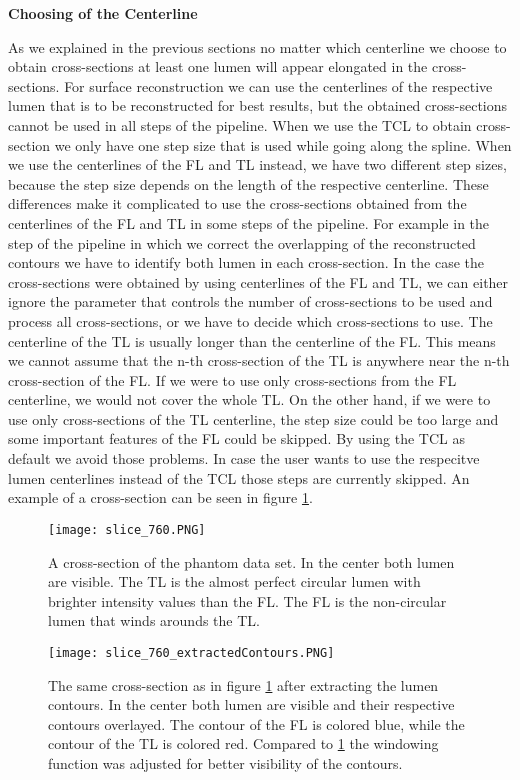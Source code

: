 \documentclass[thesis.tex]{subfiles}
\begin{document}
\textbf{Choosing of the Centerline}

As we explained in the previous sections no matter which centerline we choose to obtain cross-sections at least one lumen will appear elongated in the cross-sections. For surface reconstruction we can use the centerlines of the respective lumen that is to be reconstructed for best results, but the obtained cross-sections cannot be used in all steps of the pipeline. 
When we use the TCL to obtain cross-section we only have one step size that is used while going along the spline. When we use the centerlines of the FL and TL instead, we have two different step sizes, because the step size depends on the length of the respective centerline. These differences make it complicated to use the cross-sections obtained from the centerlines of the FL and TL in some steps of the pipeline. For example in the step of the pipeline in which we correct the overlapping of the reconstructed contours we have to identify both lumen in each cross-section. In the case the cross-sections were obtained by using centerlines of the FL and TL, we can either ignore the parameter that controls the number of cross-sections to be used and process all cross-sections, or we have to decide which cross-sections to use.
The centerline of the TL is usually longer than the centerline of the FL. This means we cannot assume that the n-th cross-section of the TL is anywhere near the n-th cross-section of the FL. If we were to use only cross-sections from the FL centerline, we would not cover the whole TL. On the other hand, if we were to use only cross-sections of the TL centerline, the step size could be too large and some important features of the FL could be skipped. By using the TCL as default we avoid those problems. In case the user wants to use the respecitve lumen centerlines instead of the TCL those steps are currently skipped. An example of a cross-section can be seen in figure \ref{fig:cross-section}.

\begin{figure}[h]
\centering
\texttt{[image: slice\_760.PNG]}
\caption{A cross-section of the phantom data set. In the center both lumen are visible. The TL is the almost perfect circular lumen with brighter intensity values than the FL. The FL is the non-circular lumen that winds arounds the TL.}
\label{fig:cross-section}
\end{figure}  

\begin{figure}[h]
\centering
\texttt{[image: slice\_760\_extractedContours.PNG]}
\caption{The same cross-section as in figure \ref{fig:cross-section} after extracting the lumen contours. In the center both lumen are visible and their respective contours overlayed. The contour of the FL is colored blue, while the contour of the TL is colored red. Compared to \ref{fig:cross-section} the windowing function was adjusted for better visibility of the contours.}
\label{fig:extracted_contours}
\end{figure} 
\end{document}
